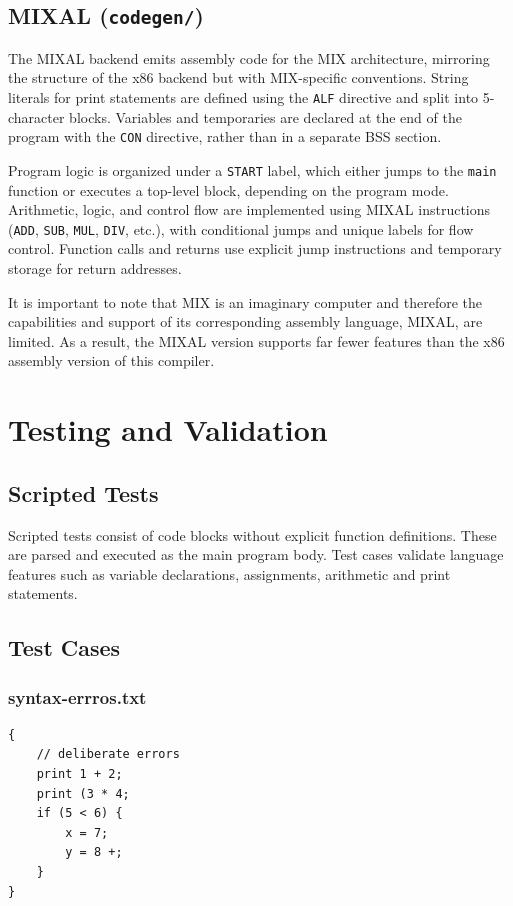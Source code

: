 \documentclass{article}
\begin{document}
    \subsection{MIXAL (\texttt{codegen/})}

    The MIXAL backend emits assembly code for the MIX architecture, mirroring the structure of the x86 backend but with MIX-specific conventions\cite{The Art of Computer Programming}. String literals for print statements are defined using the \texttt{ALF} directive and split into 5-character blocks. Variables and temporaries are declared at the end of the program with the \texttt{CON} directive, rather than in a separate BSS section\cite{Computer Organization and Assembly Language Programming}.
    
    Program logic is organized under a \texttt{START} label, which either jumps to the \texttt{main} function or executes a top-level block, depending on the program mode. Arithmetic, logic, and control flow are implemented using MIXAL instructions (\texttt{ADD}, \texttt{SUB}, \texttt{MUL}, \texttt{DIV}, etc.), with conditional jumps and unique labels for flow control. Function calls and returns use explicit jump instructions and temporary storage for return addresses.

    It is important to note that MIX is an imaginary computer and therefore the capabilities and support of its corresponding assembly language, MIXAL, are limited. As a result, the MIXAL version supports far fewer features than the x86 assembly version of this compiler.

\newpage
\section{Testing and Validation}
    \subsection{Scripted Tests} 
    Scripted tests consist of code blocks without explicit function definitions. These are parsed and executed as the main program body. Test cases validate language features such as variable declarations, assignments, arithmetic and print statements.
    
    \subsection*{Test Cases}
    \subsubsection*{syntax-errros.txt}
        \begin{lstlisting}
{   
    // deliberate errors
    print 1 + 2;
    print (3 * 4;
    if (5 < 6) {
        x = 7;
        y = 8 +;
    }
}
        \end{lstlisting}
        
\end{document}
